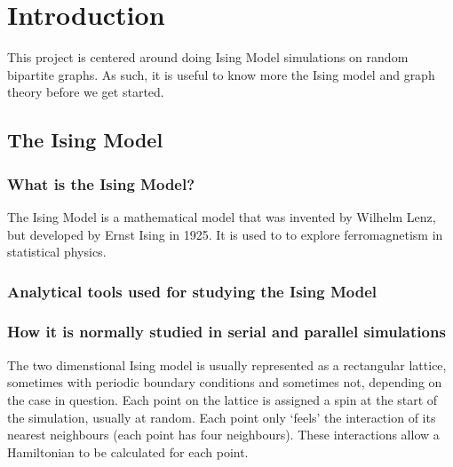 \documentclass[pdftex,12pt,a4paper]{article}
\begin{document}

\tableofcontents

\newpage
{}



\section{Introduction}

This project is centered around doing Ising Model simulations on random bipartite graphs. As such, it is useful to know more the Ising model and graph theory before we get started.


\subsection{The Ising Model}

\subsubsection{What is the Ising Model?}

The Ising Model is a mathematical model that was invented by Wilhelm Lenz, but developed by Ernst Ising in 1925. It is used to to explore ferromagnetism in statistical physics.

\subsubsection{Analytical tools used for studying the Ising Model}

\subsubsection{How it is normally studied in serial and parallel simulations}

The two dimenstional Ising model is usually represented as a rectangular lattice, sometimes with periodic boundary conditions and sometimes not, depending on the case in question. Each point on the lattice is assigned a spin at the start of the simulation, usually at random. Each point only `feels' the interaction of its nearest neighbours (each point has four neighbours). These interactions allow a Hamiltonian to be calculated for each point.
\end{document}
